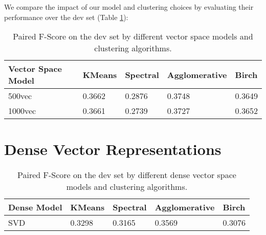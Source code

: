\documentclass[12pt]{article}
\begin{document}


We compare the impact of our model and clustering choices by evaluating their performance over the dev set (Table \ref{tab:sparseresults}):

\begin{table}[]
\centering
\begin{tabular}{l|l|l|l|l}
Vector Space Model	& KMeans	& Spectral		& Agglomerative	& Birch \\
\hline
500vec			& 0.3662	& 0.2876		& 0.3748			& 0.3649 \\
1000vec			& 0.3661	& 0.2739		& 0.3727			& 0.3652 \\        
\end{tabular}
\caption{Paired F-Score on the dev set by different vector space models and clustering algorithms.}
\label{tab:sparseresults}
\end{table}

\section{Dense Vector Representations}



\begin{table}[!h]
\centering
\begin{tabular}{l|l|l|l|l}
Dense Model	& KMeans	& Spectral		& Agglomerative	& Birch \\
\hline
SVD			& 0.3298	& 0.3165		& 0.3569			& 0.3076 \\
\end{tabular}
\caption{Paired F-Score on the dev set by different dense vector space models and clustering algorithms.}
\label{tab:denseresults}
\end{table}
\end{document}
